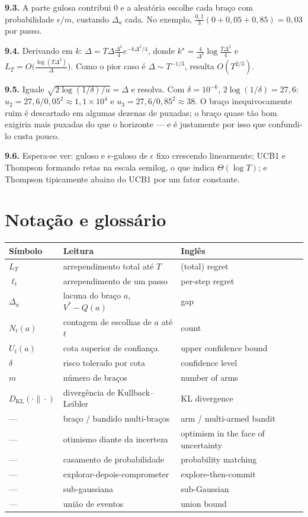 \documentclass[11pt, a4paper]{article}
\newcommand{\Nc}{N}
\newcommand{\gap}{\Delta}
\newcommand{\KL}{D_{\mathrm{KL}}}
\newcommand{\Reg}{L}
\begin{document}
\textbf{9.3.} A parte gulosa contribui $0$ e a aleatória escolhe cada braço
com probabilidade $\epsilon/m$, custando $\gap_a$ cada. No exemplo,
$\frac{0{,}1}{3}(0 + 0{,}05 + 0{,}85) = 0{,}03$ por passo.

\textbf{9.4.} Derivando em $k$: $\gap = T\gap\frac{\gap^2}{4}e^{-k\gap^2/4}$,
donde $k^{\star} = \frac{4}{\gap^2}\log\frac{T\gap^2}{4}$ e
$\Reg_T = O\bigl(\frac{\log(T\gap^2)}{\gap}\bigr)$. Como o pior caso é
$\gap \sim T^{-1/3}$, resulta $O(T^{2/3})$.

\textbf{9.5.} Iguale $\sqrt{2\log(1/\delta)/u} = \gap$ e resolva. Com
$\delta = 10^{-6}$, $2\log(1/\delta) = 27{,}6$: $u_2 = 27{,}6/0{,}05^2
\approx 1{,}1\times10^4$ e $u_3 = 27{,}6/0{,}85^2 \approx 38$. O braço
inequivocamente ruim é descartado em algumas dezenas de puxadas; o braço
quase tão bom exigiria mais puxadas do que o horizonte — e é justamente por
isso que confundi-lo custa pouco.

\textbf{9.6.} Espera-se ver: guloso e $\epsilon$-guloso de $\epsilon$ fixo
crescendo linearmente; UCB1 e Thompson formando retas na escala semilog, o
que indica $\Theta(\log T)$; e Thompson tipicamente abaixo do UCB1 por um
fator constante.

\section{Notação e glossário}

\begin{center}
\small
\begin{tabular}{lll}
\toprule
\textbf{Símbolo} & \textbf{Leitura} & \textbf{Inglês} \\
\midrule
$\Reg_T$ & arrependimento total até $T$ & (total) regret \\
$\ell_t$ & arrependimento de um passo & per-step regret \\
$\gap_a$ & lacuna do braço $a$, $V^{*}-Q(a)$ & gap \\
$\Nc_t(a)$ & contagem de escolhas de $a$ até $t$ & count \\
$U_t(a)$ & cota superior de confiança & upper confidence bound \\
$\delta$ & risco tolerado por cota & confidence level \\
$m$ & número de braços & number of arms \\
$\KL(\cdot\|\cdot)$ & divergência de Kullback--Leibler & KL divergence \\
\midrule
--- & braço / bandido multi-braços & arm / multi-armed bandit \\
--- & otimismo diante da incerteza & optimism in the face of uncertainty \\
--- & casamento de probabilidade & probability matching \\
--- & explorar-depois-comprometer & explore-then-commit \\
--- & sub-gaussiana & sub-Gaussian \\
--- & união de eventos & union bound \\
\bottomrule
\end{tabular}
\end{center}
\end{document}
